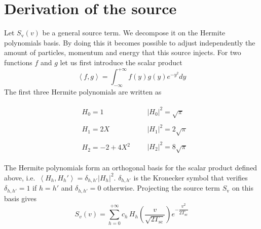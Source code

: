 \documentclass[11pt]{article}
\begin{document}
\section{Derivation of the source}
\label{sub:derivation_of_the_source_expression}

Let $S_\mathrm{v}(v)$ be a general source term. We decompose it on the Hermite polynomials basis. By doing this it becomes possible to adjust independently the amount of particles, momentum and energy that this source injects. For two functions $f$ and $g$ let us first introduce the scalar product
%
\begin{equation}
    \left< f,g\right> = \int_{-\infty}^{+\infty} f(y) g(y) e^{-y^2} dy
\end{equation}
%
The first three Hermite polynomials are written as
%
\begin{adjustwidth}{1.2cm}{1.2cm}
\begin{align*}
    &
    \begin{aligned}
        H_0 = 1
    \end{aligned} 
    &&
    \begin{aligned}
        \left| H_0 \right|^2 = \sqrt{\pi} 
    \end{aligned}\\
    &
    \begin{aligned}
        H_1 = 2X    
    \end{aligned} 
    &&
    \begin{aligned}
        \left| H_1 \right| ^2 = 2 \sqrt{\pi} 
    \end{aligned}\\
    &
    \begin{aligned}
        H_2 = - 2 + 4X^2
    \end{aligned}
    &&
    \begin{aligned}
        \left| H_2 \right| ^2 = 8 \sqrt{\pi} 
    \end{aligned}
\end{align*}
\end{adjustwidth}
%
The Hermite polynomials form an orthogonal basis for the scalar product defined above, i.e.\  $\left< H_h, H_h'\right> = \delta_{h,h'} |H_h|^2$. $\delta_{h,h'}$ is the Kronecker symbol that verifies $\delta_{h,h'} = 1$ if $h=h'$ and $\delta_{h,h'} = 0$ otherwise. Projecting the source term $S_\mathrm{v}$ on this basis gives
%
\begin{equation}\label{eq:source_expansion}
     S_{v}(v) = \sum\limits_{h = 0}^{+\infty} c_h \, H_h \left( \dfrac{v}{\sqrt{2 T_\mathrm{sc}} } \right) e^{- \dfrac{v^2}{2 T_\mathrm{sc}}}
\end{equation}
\end{document}

